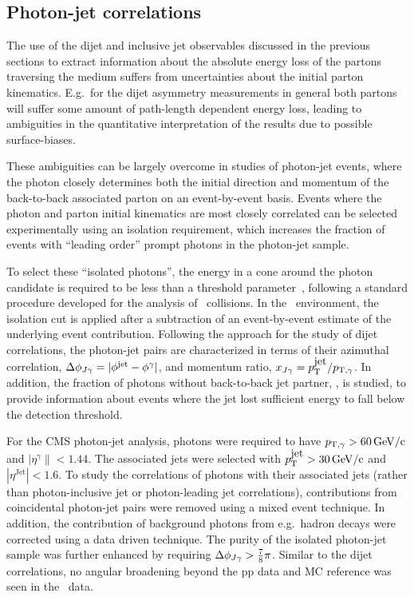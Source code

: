 \subsection{Photon-jet correlations}

The use of the dijet and inclusive jet observables discussed in the previous sections
to extract information
about the absolute energy loss of the partons traversing the medium suffers from
uncertainties about the initial parton kinematics. E.g.\ for the dijet asymmetry
measurements in general both partons will suffer some amount of path-length dependent
energy loss, leading to ambiguities in the quantitative interpretation of the results
due to possible surface-biases.

These ambiguities can be largely overcome in studies of photon-jet events,
where the photon closely determines both the initial direction and momentum
of the back-to-back associated parton on an event-by-event basis.
Events where the photon and parton initial kinematics are most closely correlated
can be selected experimentally using an isolation requirement, which
increases the fraction of events with ``leading order'' prompt photons in
the photon-jet sample.

To select these ``isolated photons'', the energy in a cone around
the photon candidate is required to be less than a threshold parameter~\cite{HIPhoton},
following a standard procedure developed for the analysis of \pp\ collisions. In the \PbPb\
environment, the isolation cut is applied after a subtraction of an event-by-event
estimate of the underlying event contribution.
Following the approach for the study of dijet correlations, the photon-jet pairs
are characterized in terms of their azimuthal correlation, $\Delta\phi_{J\gamma} = |\phi^\mathrm{jet} - \phi^{\gamma}|$,
 and momentum ratio, $x_{J\gamma} = p_{\mathrm{T}}^{\mbox{jet}}/p_{\mathrm{T},\gamma}$. In addition, the fraction of photons without
back-to-back jet partner,  \rjg, is studied, to provide information about
events where the jet lost sufficient energy to fall below the detection threshold.

For the CMS photon-jet analysis, photons were required to have $p_{\mathrm{T},\gamma} > 60\,\mathrm{GeV/c}$
and  $|\eta^\gamma\|<1.44$. The associated jets were selected with
$p_{\mathrm{T}}^{\mbox{jet}} > 30\,\mathrm{GeV/c}$ and $|\eta^{\mbox{Jet}}|<1.6$. To study the correlations of
photons with their associated jets (rather than photon-inclusive jet or photon-leading
jet correlations), contributions from
coincidental photon-jet pairs were removed using a mixed event technique. In
addition, the contribution of background photons from e.g.\ hadron decays
were corrected using a data driven technique. The purity of the isolated photon-jet
sample was further enhanced by requiring $\Delta\phi_{J\gamma} > \frac{7}{8}\pi$.
Similar to the dijet correlations, no angular broadening
beyond the pp data and MC reference was seen in the \PbPb\ data.

